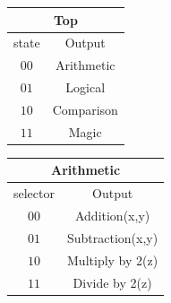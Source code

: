 \documentclass[11pt]{article}
\begin{document}
\begin{center}
    \begin{minipage}[t]{0.4\textwidth}
        \begin{center}
            \begin{tabular}{|c|c|}
                \hline
                \multicolumn{2}{|c|}{Top} \\
                \hline
                state & Output \\
                \hline
                $00$ & Arithmetic \\
                $01$ & Logical \\
                $10$ & Comparison \\
                $11$ & Magic \\
                \hline
            \end{tabular}
        \end{center}
    \end{minipage}
    \begin{minipage}[t]{0.4\textwidth}
        \begin{center}
            \begin{tabular}{|c|c|}
                \hline
                \multicolumn{2}{|c|}{Arithmetic} \\
                \hline
                selector & Output \\
                \hline
                $00$ & Addition(x,y) \\
                $01$ & Subtraction(x,y) \\
                $10$ & Multiply by 2(z) \\
                $11$ & Divide by 2(z) \\
                \hline
            \end{tabular}
        \end{center}
    \end{minipage}
\end{center}
\end{document}
